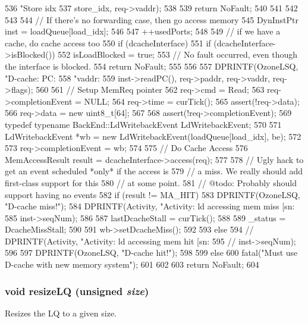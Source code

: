 \begin{DoxyCode}
{{{536                     "Store idx %
537                     store_idx, req->vaddr);
538 
539             return NoFault;
540         }
541     }
542 
543 
544     // If there's no forwarding case, then go access memory
545     DynInstPtr inst = loadQueue[load_idx];
546 
547     ++usedPorts;
548 
549     // if we have a cache, do cache access too
550     if (dcacheInterface) {
551         if (dcacheInterface->isBlocked()) {
552             isLoadBlocked = true;
553             // No fault occurred, even though the interface is blocked.
554             return NoFault;
555         }
556 
557         DPRINTF(OzoneLSQ, "D-cache: PC:%
558                 "vaddr:%
559                 inst->readPC(), req->paddr, req->vaddr, req->flags);
560 
561         // Setup MemReq pointer
562         req->cmd = Read;
563         req->completionEvent = NULL;
564         req->time = curTick();
565         assert(!req->data);
566         req->data = new uint8_t[64];
567 
568         assert(!req->completionEvent);
569         typedef typename BackEnd::LdWritebackEvent LdWritebackEvent;
570 
571         LdWritebackEvent *wb = new LdWritebackEvent(loadQueue[load_idx], be);
572 
573         req->completionEvent = wb;
574 
575         // Do Cache Access
576         MemAccessResult result = dcacheInterface->access(req);
577 
578         // Ugly hack to get an event scheduled *only* if the access is
579         // a miss.  We really should add first-class support for this
580         // at some point.
581         // @todo: Probably should support having no events
582         if (result != MA_HIT) {
583             DPRINTF(OzoneLSQ, "D-cache miss!\n");
584             DPRINTF(Activity, "Activity: ld accessing mem miss [sn:%
585                     inst->seqNum);
586 
587             lastDcacheStall = curTick();
588 
589             _status = DcacheMissStall;
590 
591             wb->setDcacheMiss();
592 
593         } else {
594 //            DPRINTF(Activity, "Activity: ld accessing mem hit [sn:%
595 //                    inst->seqNum);
596 
597             DPRINTF(OzoneLSQ, "D-cache hit!\n");
598         }
599     } else {
600         fatal("Must use D-cache with new memory system");
601     }
602 
603     return NoFault;
604 }
\end{DoxyCode}
\hypertarget{classOzoneLSQ_a3bc9500810cb2d5615e29206e2d6499f}{
\subsubsection[{resizeLQ}]{\setlength{\rightskip}{0pt plus 5cm}void resizeLQ (unsigned {\em size})}}
\label{classOzoneLSQ_a3bc9500810cb2d5615e29206e2d6499f}
Resizes the LQ to a given size. 


